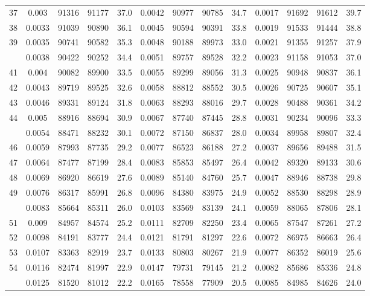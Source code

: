 \documentclass[
  14pt,
]{article}
\begin{document}
\begin{longtable}[t]{lcccccccccccc}
37 & 0.003 & 91316 & 91177 & 37.0 & 0.0042 & 90977 & 90785 & 34.7 & 0.0017 & 91692 & 91612 & 39.7\\
38 & 0.0033 & 91039 & 90890 & 36.1 & 0.0045 & 90594 & 90391 & 33.8 & 0.0019 & 91533 & 91444 & 38.8\\
39 & 0.0035 & 90741 & 90582 & 35.3 & 0.0048 & 90188 & 89973 & 33.0 & 0.0021 & 91355 & 91257 & 37.9\\
\addlinespace
40 & 0.0038 & 90422 & 90252 & 34.4 & 0.0051 & 89757 & 89528 & 32.2 & 0.0023 & 91158 & 91053 & 37.0\\
41 & 0.004 & 90082 & 89900 & 33.5 & 0.0055 & 89299 & 89056 & 31.3 & 0.0025 & 90948 & 90837 & 36.1\\
42 & 0.0043 & 89719 & 89525 & 32.6 & 0.0058 & 88812 & 88552 & 30.5 & 0.0026 & 90725 & 90607 & 35.1\\
43 & 0.0046 & 89331 & 89124 & 31.8 & 0.0063 & 88293 & 88016 & 29.7 & 0.0028 & 90488 & 90361 & 34.2\\
44 & 0.005 & 88916 & 88694 & 30.9 & 0.0067 & 87740 & 87445 & 28.8 & 0.0031 & 90234 & 90096 & 33.3\\
\addlinespace
45 & 0.0054 & 88471 & 88232 & 30.1 & 0.0072 & 87150 & 86837 & 28.0 & 0.0034 & 89958 & 89807 & 32.4\\
46 & 0.0059 & 87993 & 87735 & 29.2 & 0.0077 & 86523 & 86188 & 27.2 & 0.0037 & 89656 & 89488 & 31.5\\
47 & 0.0064 & 87477 & 87199 & 28.4 & 0.0083 & 85853 & 85497 & 26.4 & 0.0042 & 89320 & 89133 & 30.6\\
48 & 0.0069 & 86920 & 86619 & 27.6 & 0.0089 & 85140 & 84760 & 25.7 & 0.0047 & 88946 & 88738 & 29.8\\
49 & 0.0076 & 86317 & 85991 & 26.8 & 0.0096 & 84380 & 83975 & 24.9 & 0.0052 & 88530 & 88298 & 28.9\\
\addlinespace
50 & 0.0083 & 85664 & 85311 & 26.0 & 0.0103 & 83569 & 83139 & 24.1 & 0.0059 & 88065 & 87806 & 28.1\\
51 & 0.009 & 84957 & 84574 & 25.2 & 0.0111 & 82709 & 82250 & 23.4 & 0.0065 & 87547 & 87261 & 27.2\\
52 & 0.0098 & 84191 & 83777 & 24.4 & 0.0121 & 81791 & 81297 & 22.6 & 0.0072 & 86975 & 86663 & 26.4\\
53 & 0.0107 & 83363 & 82919 & 23.7 & 0.0133 & 80803 & 80267 & 21.9 & 0.0077 & 86352 & 86019 & 25.6\\
54 & 0.0116 & 82474 & 81997 & 22.9 & 0.0147 & 79731 & 79145 & 21.2 & 0.0082 & 85686 & 85336 & 24.8\\
\addlinespace
55 & 0.0125 & 81520 & 81012 & 22.2 & 0.0165 & 78558 & 77909 & 20.5 & 0.0085 & 84985 & 84626 & 24.0\\

\end{longtable}
\end{document}
